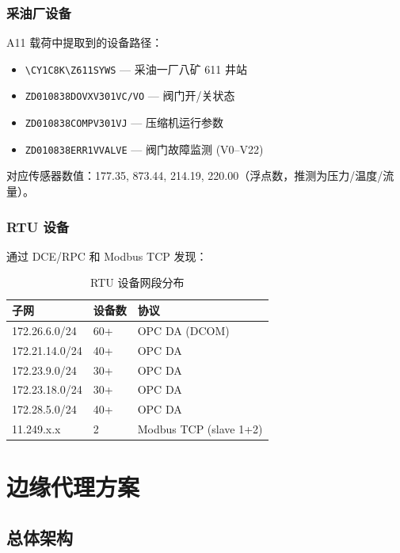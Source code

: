 \documentclass[12pt,a4paper]{ctexart}
\newcommand{\code}[1]{\texttt{\small #1}}
\begin{document}
\subsubsection{采油厂设备}

A11 载荷中提取到的设备路径：

\begin{itemize}[leftmargin=*]
  \item \code{\textbackslash CY1C8K\textbackslash Z611SYWS} — 采油一厂八矿 611 井站
  \item \code{ZD010838DOVXV301VC/VO} — 阀门开/关状态
  \item \code{ZD010838COMPV301VJ} — 压缩机运行参数
  \item \code{ZD010838ERR1VVALVE} — 阀门故障监测 (V0--V22)
\end{itemize}

对应传感器数值：177.35, 873.44, 214.19, 220.00（浮点数，推测为压力/温度/流量）。

\subsubsection{RTU 设备}

通过 DCE/RPC 和 Modbus TCP 发现：

\begin{table}[H]\centering
\caption{RTU 设备网段分布}
\begin{tabular}{p{4cm} p{2.5cm} p{5cm}}
\toprule
\textbf{子网} & \textbf{设备数} & \textbf{协议} \\
\midrule
172.26.6.0/24 & 60+ & OPC DA (DCOM) \\
172.21.14.0/24 & 40+ & OPC DA \\
172.23.9.0/24 & 30+ & OPC DA \\
172.23.18.0/24 & 30+ & OPC DA \\
172.28.5.0/24 & 40+ & OPC DA \\
11.249.x.x & 2 & Modbus TCP (slave 1+2) \\
\bottomrule
\end{tabular}
\end{table}

\section{边缘代理方案}

\subsection{总体架构}
\end{document}
